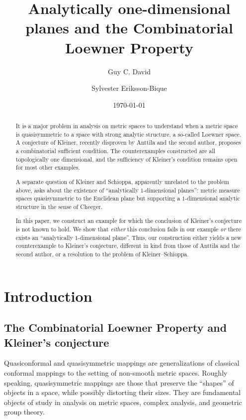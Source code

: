 \documentclass{amsart}
\title{Analytically one-dimensional planes and the Combinatorial Loewner Property}
\author{Guy C. David}
\author{Sylvester Eriksson-Bique}
\date{\today}
\theoremstyle{plain}
\theoremstyle{definition}
\numberwithin{equation}{section}
\numberwithin{theorem}{section}
\begin{document}
\begin{abstract}
It is a major problem in analysis on metric spaces to understand when a metric space is quasisymmetric to a space with strong analytic structure, a so-called Loewner space. A conjecture of Kleiner, recently disproven by Anttila and the second author, proposes a combinatorial sufficient condition. The counterexamples constructed are all topologically one dimensional, and the sufficiency of Kleiner's condition remains open for most other examples.

A separate question of Kleiner and Schioppa, apparently unrelated to the problem above, asks about the existence of ``analytically $1$-dimensional planes'': metric measure spaces quasisymmetric to the Euclidean plane but supporting a $1$-dimensional analytic structure in the sense of Cheeger.

In this paper, we construct an example for which the conclusion of Kleiner's conjecture is not known to hold. We show that \emph{either} this conclusion fails in our example \emph{or} there exists an ``analytically $1$-dimensional plane''. Thus, our construction either yields a new counterexample to Kleiner's conjecture, different in kind from those of Anttila and the second author, or a resolution to the problem of Kleiner--Schioppa.
\end{abstract}

\maketitle




\section{Introduction}

\subsection{The Combinatorial Loewner Property and Kleiner's conjecture}



Quasiconformal and quasisymmetric mappings are generalizations of classical conformal mappings to the setting of non-smooth metric spaces. Roughly speaking, quasisymmetric mappings are those that preserve the ``shapes'' of objects in a space, while possibly distorting their sizes. They are fundamental objects of study in analysis on metric spaces, complex analysis, and geometric group theory.
\end{document}
